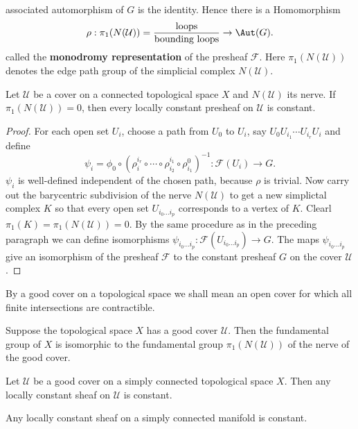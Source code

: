 associated automorphism of $G$ is the identity. Hence there is a Homomorphism
\[\rho:\pi_1(N(\mathcal{U}))=\frac{\text{loops}}{\text{bounding loops}}\to\Aut(G).\]
called the \textbf{monodromy representation} of the presheaf $\mathscr{F}$. Here $\pi_1(N(\mathcal{U}))$ denotes the edge path group of the simplicial complex $N(\mathcal{U})$.
\begin{theorem}
Let $\mathcal{U}$ be a cover on a connected topological space $X$ and $N(\mathcal{U})$ its nerve. If $\pi_1(N(\mathcal{U}))=0$, then every locally constant presheaf on 
$\mathcal{U}$ is constant.
\end{theorem}
\begin{proof}
For each open set $U_i$, choose a path from $U_0$ to $U_i$, say $U_0U_{i_1}\cdots U_{i_r}U_i$ and define 
\[\psi_i=\phi_0\circ(\rho^{i_r}_i\circ\cdots\circ\rho^{i_1}_{i_2}\circ\rho^0_{i_1})^{-1}:\mathscr{F}(U_i)\to G.\]
$\psi_i$ is well-defined independent of the chosen path, because $\rho$ is trivial. Now carry out the barycentric subdivision of the nerve $N(\mathcal{U})$ to get a 
new simplictal complex $K$ so that every open set $U_{i_0\dots i_p}$ corresponds to a vertex of $K$. Clearl $\pi_1(K)=\pi_1(N(\mathcal{U}))=0$. By the same procedure as 
in the preceding paragraph we can define isomorphisms $\psi_{i_0\dots i_p}:\mathscr{F}(U_{i_0\dots i_p})\to G$. The maps $\psi_{i_0\dots i_p}$ give an isomorphism of 
the presheaf $\mathscr{F}$ to the constant presheaf $G$ on the cover $\mathcal{U}$.
\end{proof}
By a good cover on a topological space we shall mean an open cover for which all finite intersections are contractible.
\begin{theorem}
Suppose the topological space $X$ has a good cover $\mathcal{U}$. Then the fundamental group of $X$ is isomorphic to the fundamental group $\pi_1(N(\mathcal{U}))$ of the 
nerve of the good cover.
\end{theorem}
\begin{corollary}
Let $\mathcal{U}$ be a good cover on a simply connected topological space $X$. Then any locally constant sheaf on $\mathcal{U}$ is constant.
\end{corollary}
\begin{corollary}
Any locally constant sheaf on a simply connected manifold is constant.
\end{corollary}
